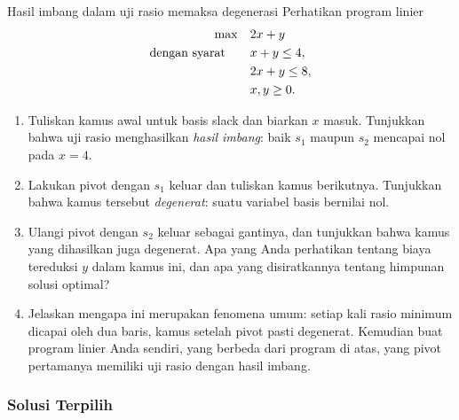 \begin{ex}{Hasil imbang dalam uji rasio memaksa degenerasi}{}
\label{ex:degenerate-tie}
 Perhatikan program linier
\[
\begin{aligned}
\max\quad & 2x + y \\
\mbox{dengan syarat}\quad\quad & x + y \leq 4, \\
& 2x + y \leq 8, \\
& x, y \geq 0.
\end{aligned}
\]
\begin{enumerate}
    \item Tuliskan kamus awal untuk basis slack dan biarkan $x$ masuk. Tunjukkan bahwa uji rasio menghasilkan \emph{hasil imbang}: baik $s_1$ maupun $s_2$ mencapai nol pada $x = 4$.
    \item Lakukan pivot dengan $s_1$ keluar dan tuliskan kamus berikutnya. Tunjukkan bahwa kamus tersebut \emph{degenerat}: suatu variabel basis bernilai nol.
    \item Ulangi pivot dengan $s_2$ keluar sebagai gantinya, dan tunjukkan bahwa kamus yang dihasilkan juga degenerat. Apa yang Anda perhatikan tentang biaya tereduksi $y$ dalam kamus ini, dan apa yang disiratkannya tentang himpunan solusi optimal?
    \item Jelaskan mengapa ini merupakan fenomena umum: setiap kali rasio minimum dicapai oleh dua baris, kamus setelah pivot pasti degenerat. Kemudian buat program linier Anda sendiri, yang berbeda dari program di atas, yang pivot pertamanya memiliki uji rasio dengan hasil imbang.
\end{enumerate}
\exrefs{\S\ref{sec:degeneracy}; \S\ref{sec:simplex-algorithm}}
\end{ex}

\subsubsection*{Solusi Terpilih}


